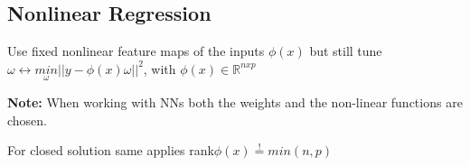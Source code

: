 \subsection{Nonlinear Regression}

Use fixed nonlinear feature maps of the inputs $\phi(x)$ but still tune $\omega \leftrightarrow \underset{\omega}{min} ||y - \phi(x)\omega||^2$, with $\phi(x) \in \mathbb{R}^{nxp}$

\textbf{Note: } When working with NNs both the weights and the non-linear functions are chosen.

For closed solution same applies rank$\phi(x) \overset{!}{=} min(n,p)$
